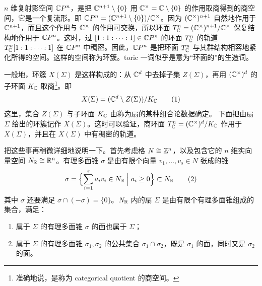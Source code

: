 $n$ 维复射影空间 $\mathbb{C}P^n$，是把 $\mathbb{C}^{n+1}\setminus\{0\}$ 用 $\mathbb{C}^\times=\mathbb{C}\setminus\{0\}$ 的作用取商得到的商空间，它是一个复流形。即 $\mathbb{C}P^n=(\mathbb{C}^{n+1}\setminus\{0\})/\mathbb{C}^\times$。因为 $(\mathbb{C}^\times)^{n+1}$ 自然地作用于 $\mathbb{C}^{n+1}$，而且这个作用与 $\mathbb{C}^\times$ 的作用可交换，所以环面 $T^n_{\mathbb{C}}=(\mathbb{C}^\times)^{n+1}/\mathbb{C}^\times$ 保复结构地作用于 $\mathbb{C}P^n$。这时，过 $[1:1:\cdots:1]\in\mathbb{C}P^n$ 的环面 $T^n_{\mathbb{C}}$ 的轨道 $T^n_{\mathbb{C}}[1:1:\cdots:1]$ 在 $\mathbb{C}P^n$ 中稠密。因此，$\mathbb{C}P^n$ 是把环面 $T^n_{\mathbb{C}}$ 与其群结构相容地紧化所得的空间。这样的空间称为环簇。toric 一词似乎是意为“环面的”的生造词。

一般地，环簇 $X(\Sigma)$ 是这样构成的：从 $\mathbb{C}^d$ 中去掉子集 $Z(\Sigma)$，再用 $(\mathbb{C}^\times)^d$ 的子环面 $K_{\mathbb{C}}$ 取商\footnote{准确地说，是称为 categorical quotient 的商空间。}。即
\begin{equation}
  X(\Sigma)=(\mathbb{C}^d\setminus Z(\Sigma))/K_{\mathbb{C}} \tag{1}
\end{equation}
这里，集合 $Z(\Sigma)$ 与子环面 $K_{\mathbb{C}}$ 由称为扇的某种组合论数据确定。
下面把由扇 $\Sigma$ 给出的环簇记作 $X(\Sigma)$。这时可以验证，商环面 $T^n_{\mathbb{C}}=(\mathbb{C}^\times)^d/K_{\mathbb{C}}$ 作用于 $X(\Sigma)$，并且在 $X(\Sigma)$ 中有稠密的轨道。

把这些事再稍微详细地说明一下。首先考虑格 $N\cong\mathbb{Z}^n$，以及包含它的 $n$ 维实向量空间 $N_{\mathbb{R}}\cong\mathbb{R}^n$。有理多面锥 $\sigma$ 是由有限个向量 $v_1,\dots,v_s\in N$ 张成的锥
\begin{equation}
  \sigma=\Bigl\{\sum_{i=1}^{s}a_iv_i\in N_{\mathbb{R}}\Bigm|a_i\ge 0\Bigr\}\subset N_{\mathbb{R}} \tag{2}
\end{equation}
其中 $\sigma$ 还要满足 $\sigma\cap(-\sigma)=\{0\}$。$N_{\mathbb{R}}$ 内的扇 $\Sigma$ 是由有限个有理多面锥组成的集合，满足：
\begin{enumerate}[label=\arabic*.,leftmargin=2.2em,itemsep=1pt,topsep=2pt]
  \item 属于 $\Sigma$ 的有理多面锥 $\sigma$ 的面也属于 $\Sigma$；
  \item 属于 $\Sigma$ 的有理多面锥 $\sigma_1,\sigma_2$ 的公共集合 $\sigma_1\cap\sigma_2$，既是 $\sigma_1$ 的面，同时又是 $\sigma_2$ 的面。
\end{enumerate}

